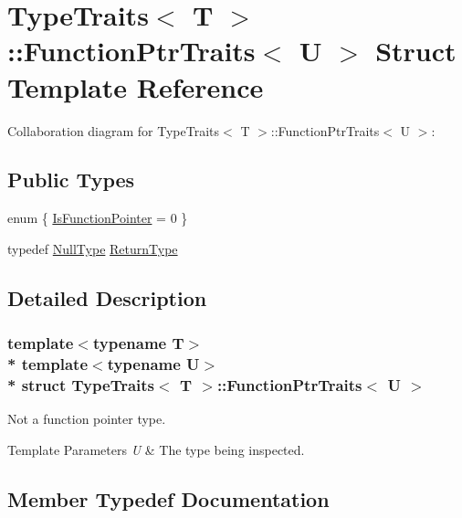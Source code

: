 \hypertarget{structTypeTraits_1_1FunctionPtrTraits}{}\section{Type\+Traits$<$ T $>$\+:\+:Function\+Ptr\+Traits$<$ U $>$ Struct Template Reference}
\label{structTypeTraits_1_1FunctionPtrTraits}


Collaboration diagram for Type\+Traits$<$ T $>$\+:\+:Function\+Ptr\+Traits$<$ U $>$\+:
\subsection*{Public Types}
\begin{DoxyCompactItemize}
\item 
enum \{ \hyperlink{structTypeTraits_1_1FunctionPtrTraits_a6b28b9e38bb61936ac443fad3b42b2a6a55f078e9f7c2767049ff163751e373ca}{Is\+Function\+Pointer} = 0
 \}
\item 
typedef \hyperlink{structTypeTraits_1_1NullType}{Null\+Type} \hyperlink{structTypeTraits_1_1FunctionPtrTraits_ab22dd11fa966ac0dd3f09b23464a518a}{Return\+Type}
\end{DoxyCompactItemize}


\subsection{Detailed Description}
\subsubsection*{template$<$typename T$>$\\*
template$<$typename U$>$\\*
struct Type\+Traits$<$ T $>$\+::\+Function\+Ptr\+Traits$<$ U $>$}

Not a function pointer type. 
\begin{DoxyTemplParams}{Template Parameters}
{\em U} & The type being inspected. \\
\hline
\end{DoxyTemplParams}


\subsection{Member Typedef Documentation}
